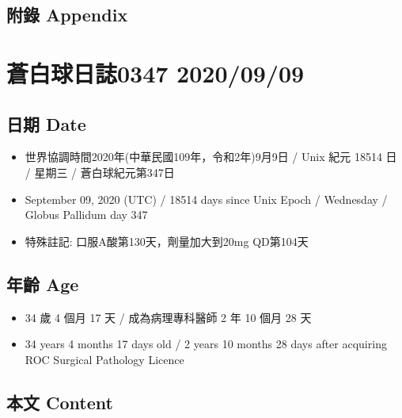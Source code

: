 \documentclass[a5paper, 11pt
]{book}
\providecommand{\tightlist}{%
  \setlength{\itemsep}{0pt}\setlength{\parskip}{0pt}}
\begin{document}
\hypertarget{ux9644ux9304-appendix-7}{%
\subsection{附錄 Appendix}\label{ux9644ux9304-appendix-7}}

\hypertarget{ux84bcux767dux7403ux65e5ux8a8c0347-20200909}{%
\section{蒼白球日誌0347
2020/09/09}\label{ux84bcux767dux7403ux65e5ux8a8c0347-20200909}}

\hypertarget{ux65e5ux671f-date-8}{%
\subsection{日期 Date}\label{ux65e5ux671f-date-8}}

\begin{itemize}
\tightlist
\item
  世界協調時間2020年(中華民國109年，令和2年)9月9日 / Unix 紀元 18514 日
  / 星期三 / 蒼白球紀元第347日
\item
  September 09, 2020 (UTC) / 18514 days since Unix Epoch / Wednesday /
  Globus Pallidum day 347
\item
  特殊註記: 口服A酸第130天，劑量加大到20mg QD第104天
\end{itemize}

\hypertarget{ux5e74ux9f61-age-8}{%
\subsection{年齡 Age}\label{ux5e74ux9f61-age-8}}

\begin{itemize}
\tightlist
\item
  34 歲 4 個月 17 天 / 成為病理專科醫師 2 年 10 個月 28 天
\item
  34 years 4 months 17 days old / 2 years 10 months 28 days after
  acquiring ROC Surgical Pathology Licence
\end{itemize}

\hypertarget{ux672cux6587-content-8}{%
\subsection{本文 Content}\label{ux672cux6587-content-8}}
\end{document}
